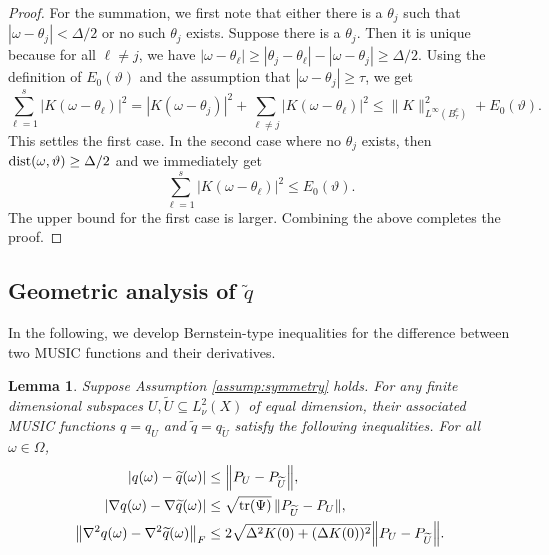 \documentclass[11pt]{article}
\newtheorem{lemma}[theorem]{Lemma}
\theoremstyle{definition}
\numberwithin{theorem}{section}
\numberwithin{lemma}{section}
\numberwithin{equation}{section}
\renewcommand{\subset}{\subseteq}
\renewcommand{\tilde}{\widetilde}
\def\dist{{\rm dist}}
\def\trace{{\rm tr}}
\newcommand{\domain}{\Omega}
\newcommand{\sampset}{X}
\newcommand{\norm}[1]{{\left\|#1\right\|}}
\numberwithin{equation}{section}
\begin{document}
\begin{proof}
	For the summation, we first note that either there is a $\theta_j$ such that $|\omega-\theta_j|<\Delta/2$ or no such $\theta_j$ exists. Suppose there is a $\theta_j$. Then it is unique because for all $\ell\ne j$, we have $|\omega-\theta_\ell|\geq |\theta_j-\theta_\ell|- |\omega-\theta_j|\geq \Delta/2$. Using the definition of $E_0(\vartheta)$ and the assumption that $|\omega-\theta_j|\geq \tau$, we get
	$$
	\sum_{\ell=1}^s |K(\omega-\theta_\ell)|^2
	= |K(\omega-\theta_j)|^2 + \sum_{\ell\ne j} |K(\omega-\theta_\ell)|^2
	\leq \|K\|_{L^\infty(B_\tau^c)}^2 + E_0(\vartheta). 
	$$
	This settles the first case. In the second case where no $\theta_j$ exists, then $\dist(\omega,\vartheta)\geq \Delta/2$ and we immediately get
	$$
	\sum_{\ell=1}^s |K(\omega-\theta_\ell)|^2
	\leq E_0(\vartheta). 
	$$
	The upper bound for the first case is larger. Combining the above completes the proof. 
	\end{proof}
	
	\subsection{Geometric analysis of $\tilde q$}
	
	In the following, we develop Bernstein-type inequalities for the difference between two MUSIC functions and their derivatives.
	
	\begin{lemma}
		\label{lem:bernstein}
		Suppose Assumption \ref{assump:symmetry} holds. For any finite dimensional subspaces $U,\tilde U\subset L^2_\nu(\sampset)$ of equal dimension, their associated MUSIC functions $q=q_U$ and $\tilde q=q_{\tilde U}$ satisfy the following inequalities. For all $\omega\in \domain$,
		\begin{align}
			|q(\omega)-\tilde q(\omega)|
			&\leq \norm{P_U-P_{\tilde U}}, \label{eq:bernstein0} \\
			|\nabla q(\omega)-\nabla \tilde q(\omega)|
			&\leq \sqrt{\trace(\Psi)} \, \|P_{\tilde U} -P_U\|, \label{eq:bernstein1} \\
			\norm{\nabla^2 q(\omega)-\nabla^2 \tilde q(\omega)}_F
			&\leq 2 \sqrt{ \Delta^2 K(0) + (\Delta K(0))^2} \norm{P_U-P_{\tilde U}}. \label{eq:bernstein2} 
		\end{align}
	\end{lemma}
	
\end{document}
